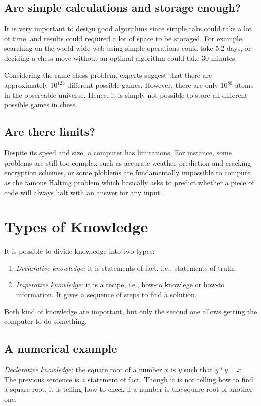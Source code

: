 \documentclass[a4paper]{article}
\begin{document}
\subsection{Are simple calculations and storage enough?}

It is very important to design good algorithms since simple taks could take
a lot of time, and results could required a lot of space to be storaged.
For example, searching on the world wide web using simple operations could take
5.2 days, or deciding a chess move without an optimal algorithm could take 30
minutes.

Considering the same chess problem, experts suggest that there are
approximately $10^{123}$ different possible games. However, there are only
$10^{80}$ atoms in the observable universe. Hence, it is simply not
possible to store all different possible games in chess.

\subsection{Are there limits?}

Despite its speed and size, a computer has limitations. For instance, some
problems are still too complex such as accurate weather prediction and
cracking encryption schemes, or some ploblems are fundamentally impossible to
compute as the famous Halting problem which basically asks to predict whether
a piece of code will always halt with an answer for any input.

\section{Types of Knowledge}

It is possible to divide knowledge into two types:

\begin{enumerate}
  \item \textit{Declarative knowledge:} it is statements of fact, i.e., statements of
        truth.
  \item \textit{Imperative knowledge:} it is a recipe, i.e., how-to knowlege or how-to
        information. It gives a sequence of steps to find a solution.
\end{enumerate}

Both kind of knowledge are important, but only the second one allows getting
the computer to do something.

\subsection{A numerical example}
\textit{Declarative knowledge:} the square root of a number $x$ is $y$ such
that $y * y = x$. The previous sentence is a statement of fact. Though it is
not telling how to find a square root, it is telling how to check if a number
is the square root of another one.
\end{document}
